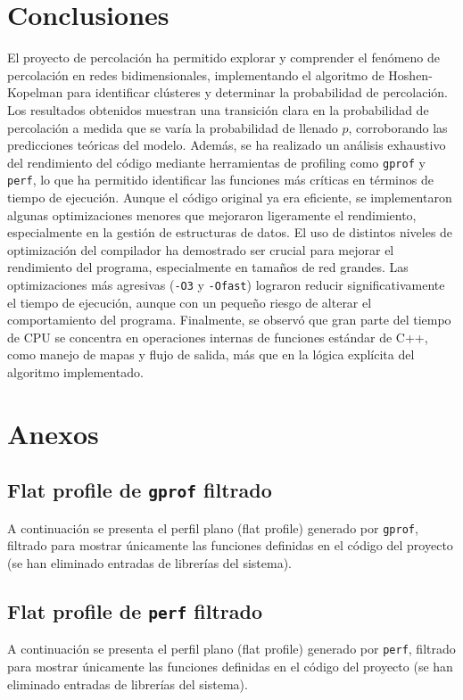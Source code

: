\documentclass{article}
\begin{document}
\section{Conclusiones}
El proyecto de percolación ha permitido explorar y comprender el fenómeno de percolación en redes bidimensionales, implementando el algoritmo de Hoshen-Kopelman para identificar clústeres y determinar la probabilidad de percolación. Los resultados obtenidos muestran una transición clara en la probabilidad de percolación a medida que se varía la probabilidad de llenado \(p\), corroborando las predicciones teóricas del modelo.
Además, se ha realizado un análisis exhaustivo del rendimiento del código mediante herramientas de profiling como \texttt{gprof} y \texttt{perf}, lo que ha permitido identificar las funciones más críticas en términos de tiempo de ejecución. Aunque el código original ya era eficiente, se implementaron algunas optimizaciones menores que mejoraron ligeramente el rendimiento, especialmente en la gestión de estructuras de datos.
El uso de distintos niveles de optimización del compilador ha demostrado ser crucial para mejorar el rendimiento del programa, especialmente en tamaños de red grandes. Las optimizaciones más agresivas (\texttt{-O3} y \texttt{-Ofast}) lograron reducir significativamente el tiempo de ejecución, aunque con un pequeño riesgo de alterar el comportamiento del programa.
Finalmente, se observó que gran parte del tiempo de CPU se concentra en operaciones internas de funciones estándar de C++, como manejo de mapas y flujo de salida, más que en la lógica explícita del algoritmo implementado.


\clearpage
\appendix
\section{Anexos}

\subsection{Flat profile de \texttt{gprof} filtrado}
\label{app:flat_profile}

A continuación se presenta el perfil plano (flat profile) generado por \texttt{gprof}, filtrado para mostrar únicamente las funciones definidas en el código del proyecto (se han eliminado entradas de librerías del sistema).



\subsection{Flat profile de \texttt{perf} filtrado}
\label{app:flat_profile_perf}

A continuación se presenta el perfil plano (flat profile) generado por \texttt{perf}, filtrado para mostrar únicamente las funciones definidas en el código del proyecto (se han eliminado entradas de librerías del sistema).


\end{document}
